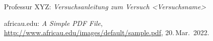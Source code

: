 
\begin{thebibliography}{}
	Professur XYZ:	\emph{Versuchsanleitung zum Versuch <Versuchsname>}
	
	africau.edu:
	\emph{A Simple PDF File}, \url{http://www.africau.edu/images/default/sample.pdf}, 20.\,Mar.~2022.
\end{thebibliography}

